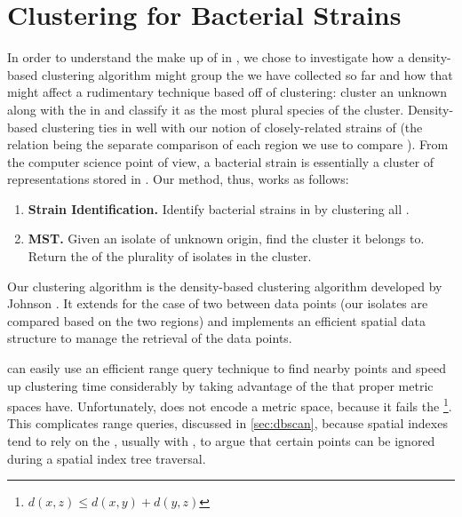 \section{Clustering for Bacterial Strains}\label{sec:method:clustering}
In order to understand the make up of \bslongs{} in \cplop{}, we chose to investigate how a density-based clustering algorithm might group the \isols{} we have collected so far and how that might affect a rudimentary \mst{} technique based off of clustering: cluster an unknown \isol{} along with the \isols{} in \cplop{} and classify it as the most plural species of the cluster.
Density-based clustering ties in well with our notion of closely-related strains of \ecoli{} (the relation being the separate \pearson{} comparison of each \itsshort{} region we use to compare \isols{}).
From the computer science point of view, a bacterial strain is essentially a cluster of \ecoli{} \isol{} representations stored in \cplop{}.
Our \mst{} method, thus, works as follows:
\begin{enumerate}
    \item \textbf{Strain Identification.} Identify bacterial strains in \cplop{} by clustering
    all \cplop{} \isols{}.
    \item \textbf{MST.} Given an isolate of unknown origin, find the cluster it belongs to.
    Return the \spec{} of the plurality of isolates in the cluster.
\end{enumerate}

Our clustering algorithm is the density-based clustering algorithm developed by Johnson \cite{johnson2015density}.
It extends \dbscan{} for the case of two \compfuncs{} between data points (our isolates are compared based on the two \itsshort{} regions) and implements an efficient spatial data structure to manage the retrieval of the data points.

\dbscan{} can easily use an efficient range query technique to find nearby points and speed up clustering time considerably by taking advantage of the \trieq{} that proper metric spaces have.
Unfortunately, \pearson{} does not encode a metric space, because it fails the \trieq{}\footnote{$d(x,z)\leq d(x,y) + d(y,z)$}. 
This complicates range queries, discussed in \autoref{sec:dbscan}, because spatial indexes tend to rely on the \trieq{}, usually with \euclid{}, to argue that certain points can be ignored during a spatial index tree traversal. 

